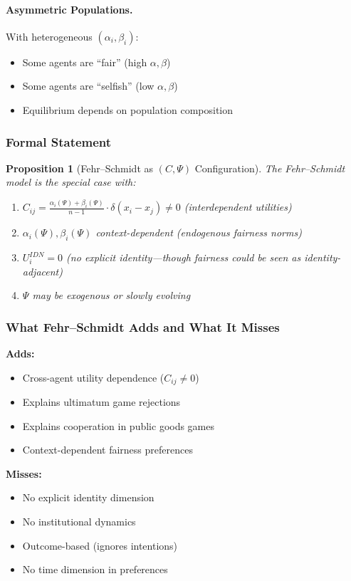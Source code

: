 \documentclass[12pt,a4paper]{article}
\newtheorem{proposition}[theorem]{Proposition}
\begin{document}
\paragraph{Asymmetric Populations.}
With heterogeneous $(\alpha_i, \beta_i)$:
\begin{itemize}
  \item Some agents are ``fair'' (high $\alpha, \beta$)
  \item Some agents are ``selfish'' (low $\alpha, \beta$)
  \item Equilibrium depends on population composition
\end{itemize}

\subsubsection{Formal Statement}

\begin{proposition}[Fehr--Schmidt as $(C, \Psi)$ Configuration]
The Fehr--Schmidt model is the special case with:
\begin{enumerate}
  \item $C_{ij} = \frac{\alpha_i(\Psi) + \beta_i(\Psi)}{n-1} \cdot \delta(x_i - x_j) \neq 0$ 
        (interdependent utilities)
  \item $\alpha_i(\Psi), \beta_i(\Psi)$ context-dependent (endogenous fairness norms)
  \item $U_i^{IDN} = 0$ (no explicit identity---though fairness could be seen as identity-adjacent)
  \item $\Psi$ may be exogenous or slowly evolving
\end{enumerate}
\end{proposition}

\subsubsection{What Fehr--Schmidt Adds and What It Misses}

\textbf{Adds:}
\begin{itemize}
  \item Cross-agent utility dependence ($C_{ij} \neq 0$)
  \item Explains ultimatum game rejections
  \item Explains cooperation in public goods games
  \item Context-dependent fairness preferences
\end{itemize}

\textbf{Misses:}
\begin{itemize}
  \item No explicit identity dimension
  \item No institutional dynamics
  \item Outcome-based (ignores intentions)
  \item No time dimension in preferences
\end{itemize}
\end{document}
